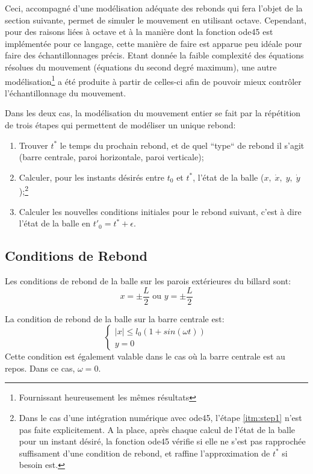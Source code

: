 \documentclass[a4paper]{report}
\begin{document}
Ceci, accompagné d'une modélisation adéquate des rebonds qui fera l'objet de la section suivante, permet de simuler le mouvement en utilisant octave. Cependant, pour des raisons liées à octave et à la manière dont la fonction ode45 est implémentée pour ce langage, cette manière de faire est apparue peu idéale pour faire des échantillonnages précis. Etant donnée la faible complexité des équations résolues du mouvement (équations du second degré maximum), une autre modélisation\footnote{Fournissant heureusement les mêmes résultats} a été produite à partir de celles-ci afin de pouvoir mieux contrôler l'échantillonnage du mouvement.

Dans les deux cas, la modélisation du mouvement entier se fait par la répétition de trois étapes qui permettent de modéliser un unique rebond:
\begin{enumerate}
 \item Trouver \(t^*\) le temps du prochain rebond, et de quel ``type`` de rebond il s'agit (barre centrale, paroi horizontale, paroi verticale)\label{itm:step1};
 \item Calculer, pour les instants désirés entre \(t_0\) et \(t^*\), l'état de la balle (\(x, \; \dot{x}, \; y, \; \dot{y} \));\footnote{Dans le cas d'une intégration numérique avec ode45, l'étape \ref{itm:step1} n'est pas faite explicitement. A la place, après chaque calcul de l'état de la balle pour un instant désiré, la fonction ode45 vérifie si elle ne s'est pas rapprochée suffisament d'une condition de rebond, et raffine l'approximation de \(t^*\) si besoin est.}
 \item Calculer les nouvelles conditions initiales pour le rebond suivant, c'est à dire l'état de la balle en \(t'_0=t^*+\epsilon\).
\end{enumerate}
\subsection{Conditions de Rebond}
Les conditions de rebond de la balle sur les parois extérieures du billard sont:
\begin{equation*}
 x=\pm \frac{L}{2} \text{ ou } y=\pm \frac{L}{2}
\end{equation*}

La condition de rebond de la balle sur la barre centrale est:
\begin{equation}
\label{eqn:rebCentr}
\begin{cases}
\lvert x \rvert \leq l_0(1+sin(\omega t))\\
y=0
\end{cases}
\end{equation}
Cette condition est également valable dans le cas où la barre centrale est au repos. Dans ce cas, \(\omega=0\).
\end{document}
